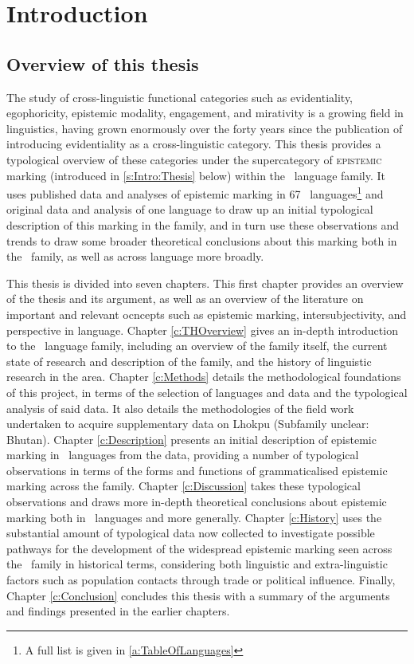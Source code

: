 \chapter{Introduction}\label{c:Introduction}
\section{Overview of this thesis}
The study of cross-linguistic functional categories such as evidentiality, egophoricity, epistemic modality, engagement, and mirativity is a growing field in linguistics, having grown enormously over the forty years since the publication of  introducing evidentiality as a cross-linguistic category. This thesis provides a typological overview of these categories under the supercategory of \textsc{epistemic} marking (introduced in \ref{s:Intro:Thesis} below) within the \lfam\ language family. It uses published data and analyses of epistemic marking in 67 \lfam\ languages\footnote{A full list is given in \ref{a:TableOfLanguages}} and original data and analysis of one language to draw up an initial typological description of this marking in the family, and in turn use these observations and trends to draw some broader theoretical conclusions about this marking both in the \lfam\ family, as well as across language more broadly.

This thesis is divided into seven chapters. This first chapter provides an overview of the thesis and its argument, as well as an overview of the literature on important and relevant ocncepts such as epistemic marking, intersubjectivity, and perspective in language. Chapter \ref{c:THOverview} gives an in-depth introduction to the \lfam\ language family, including an overview of the family itself, the current state of research and description of the family, and the history of linguistic research in the area. Chapter \ref{c:Methods} details the methodological foundations of this project, in terms of the selection of languages and data and the typological analysis of said data. It also details the methodologies of the field work undertaken to acquire supplementary data on Lhokpu (Subfamily unclear: Bhutan). Chapter \ref{c:Description} presents an initial description of epistemic marking in \lfam\ languages from the data, providing a number of typological observations in terms of the forms and functions of grammaticalised epistemic marking across the family. Chapter \ref{c:Discussion} takes these typological observations and draws more in-depth theoretical conclusions about epistemic marking both in \lfam\ languages and more generally. Chapter \ref{c:History} uses the substantial amount of typological data now collected to investigate possible pathways for the development of the widespread epistemic marking seen across the \lfam\ family in historical terms, considering both linguistic and extra-linguistic factors such as population contacts through trade or political influence. Finally, Chapter \ref{c:Conclusion} concludes this thesis with a summary of the arguments and findings presented in the earlier chapters.

